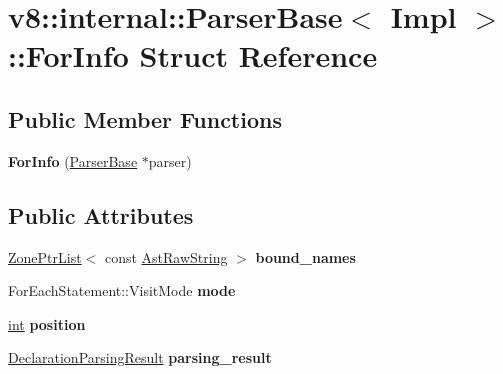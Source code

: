 \hypertarget{structv8_1_1internal_1_1ParserBase_1_1ForInfo}{}\section{v8\+:\+:internal\+:\+:Parser\+Base$<$ Impl $>$\+:\+:For\+Info Struct Reference}
\label{structv8_1_1internal_1_1ParserBase_1_1ForInfo}
\subsection*{Public Member Functions}
\begin{DoxyCompactItemize}
\item 
\mbox{\label{structv8_1_1internal_1_1ParserBase_1_1ForInfo_af8dc62c9aeaee49b33fccb8063868837}} 
{\bfseries For\+Info} (\mbox{\hyperlink{classv8_1_1internal_1_1ParserBase}{Parser\+Base}} $\ast$parser)
\end{DoxyCompactItemize}
\subsection*{Public Attributes}
\begin{DoxyCompactItemize}
\item 
\mbox{\label{structv8_1_1internal_1_1ParserBase_1_1ForInfo_ae2d9a51b45436dd3eb1d316a2b49e52f}} 
\mbox{\hyperlink{classv8_1_1internal_1_1ZoneList}{Zone\+Ptr\+List}}$<$ const \mbox{\hyperlink{classv8_1_1internal_1_1AstRawString}{Ast\+Raw\+String}} $>$ {\bfseries bound\+\_\+names}
\item 
\mbox{\label{structv8_1_1internal_1_1ParserBase_1_1ForInfo_ab9989c4c8371b8189fb01af9b132d3a6}} 
For\+Each\+Statement\+::\+Visit\+Mode {\bfseries mode}
\item 
\mbox{\label{structv8_1_1internal_1_1ParserBase_1_1ForInfo_a943bc670a74faa33660c80e02e547006}} 
\mbox{\hyperlink{classint}{int}} {\bfseries position}
\item 
\mbox{\label{structv8_1_1internal_1_1ParserBase_1_1ForInfo_ae37fc297a2d1b60d9a12ed5499f6e66f}} 
\mbox{\hyperlink{structv8_1_1internal_1_1ParserBase_1_1DeclarationParsingResult}{Declaration\+Parsing\+Result}} {\bfseries parsing\+\_\+result}
\end{DoxyCompactItemize}


